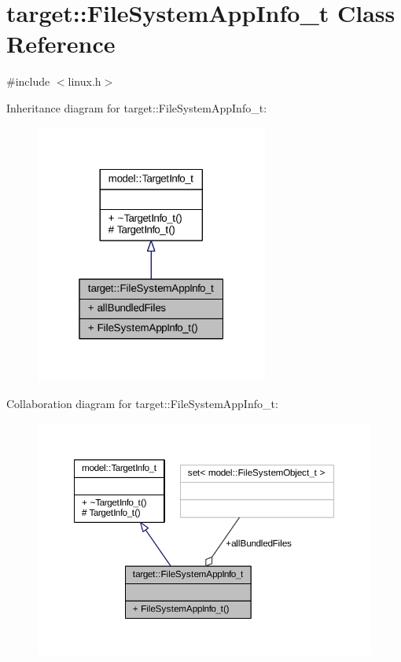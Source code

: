 \hypertarget{classtarget_1_1_file_system_app_info__t}{}\section{target\+:\+:File\+System\+App\+Info\+\_\+t Class Reference}
\label{classtarget_1_1_file_system_app_info__t}


{\ttfamily \#include $<$linux.\+h$>$}



Inheritance diagram for target\+:\+:File\+System\+App\+Info\+\_\+t\+:
\nopagebreak
\begin{figure}[H]
\begin{center}
\leavevmode
\includegraphics[width=217pt]{classtarget_1_1_file_system_app_info__t__inherit__graph}
\end{center}
\end{figure}


Collaboration diagram for target\+:\+:File\+System\+App\+Info\+\_\+t\+:
\nopagebreak
\begin{figure}[H]
\begin{center}
\leavevmode
\includegraphics[width=350pt]{classtarget_1_1_file_system_app_info__t__coll__graph}
\end{center}
\end{figure}
